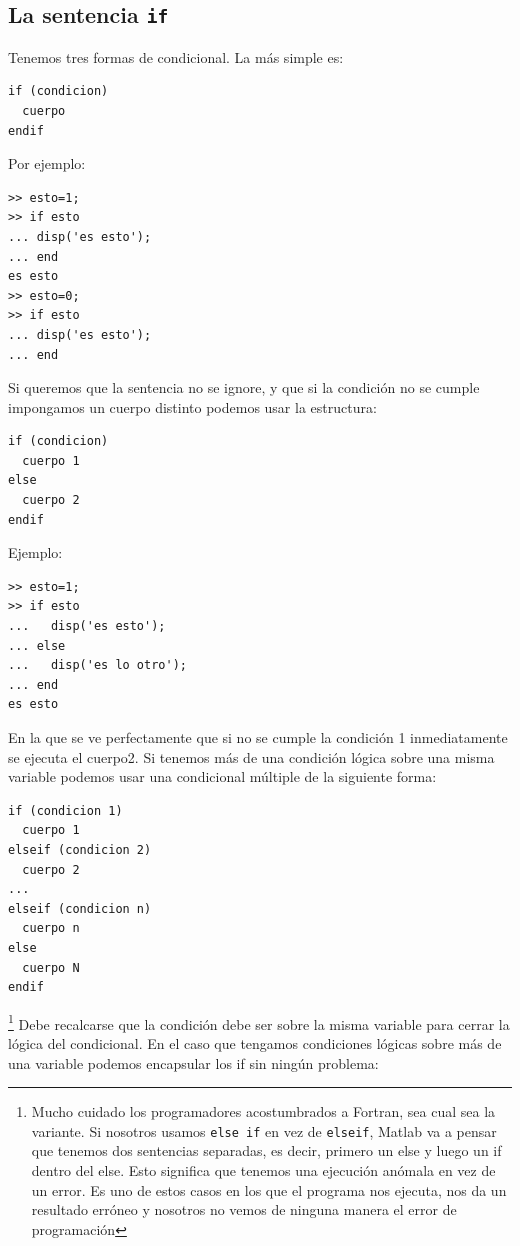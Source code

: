 \subsection{La sentencia \texttt{if}}

Tenemos tres formas de condicional. La más simple es:

\begin{lstlisting}
if (condicion)
  cuerpo
endif
\end{lstlisting}
Por ejemplo:
\begin{lstlisting}
>> esto=1;
>> if esto
... disp('es esto');
... end
es esto
>> esto=0;
>> if esto
... disp('es esto');
... end
\end{lstlisting}

Si queremos que la sentencia no se ignore, y que si la condición no se
cumple impongamos un cuerpo distinto podemos usar la estructura:

\begin{lstlisting}
if (condicion)   
  cuerpo 1   
else    
  cuerpo 2   
endif
\end{lstlisting}
Ejemplo:
\begin{lstlisting}
>> esto=1;
>> if esto
...   disp('es esto');
... else
...   disp('es lo otro');
... end
es esto
\end{lstlisting}

En la que se ve perfectamente que si no se cumple la condición 1
inmediatamente se ejecuta el cuerpo2. Si tenemos más de una condición
lógica sobre una misma variable podemos usar una condicional múltiple
de la siguiente forma:

\begin{lstlisting}
if (condicion 1)   
  cuerpo 1   
elseif (condicion 2)   
  cuerpo 2   
...   
elseif (condicion n)   
  cuerpo n   
else   
  cuerpo N   
endif
\end{lstlisting}

\footnote{Mucho cuidado los programadores acostumbrados a Fortran, sea
  cual sea la variante.  Si nosotros usamos \texttt{else if} en vez de
  \texttt{elseif}, Matlab va a pensar que tenemos dos sentencias
  separadas, es decir, primero un else y luego un if dentro del else.
  Esto significa que tenemos una ejecución anómala en vez de un error.
  Es uno de estos casos en los que el programa nos ejecuta, nos da un
  resultado erróneo y nosotros no vemos de ninguna manera el error de
  programación%
} Debe recalcarse que la condición debe ser sobre la misma variable
para cerrar la lógica del condicional. En el caso que tengamos
condiciones lógicas sobre más de una variable podemos encapsular los
if sin ningún problema:

